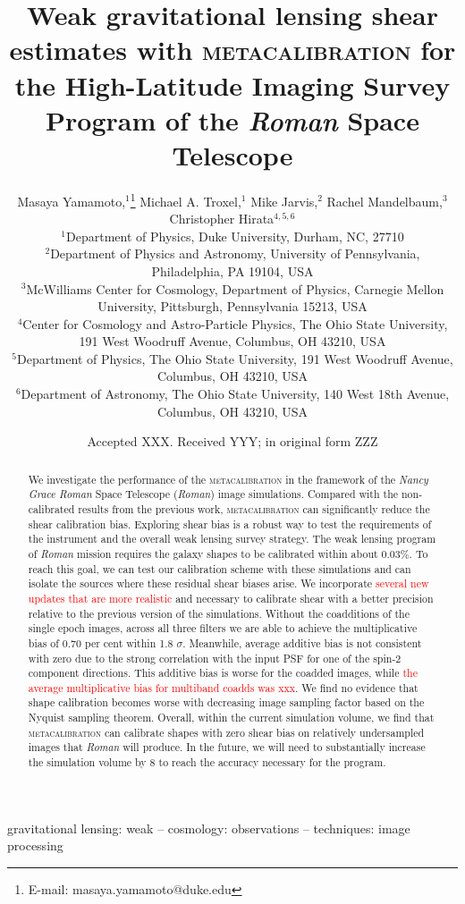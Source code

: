 \documentclass[fleqn,usenatbib]{mnras}
\title[Metacalibration with Roman High-Latitude Imaging Survey]{Weak gravitational lensing shear estimates with \textsc{metacalibration} for the High-Latitude Imaging Survey Program of the \emph{Roman} Space Telescope}
\author[M. Yamamoto et al.]{
Masaya Yamamoto,$^{1}$\thanks{E-mail: masaya.yamamoto@duke.edu}
Michael A. Troxel,$^{1}$
Mike Jarvis,$^{2}$
Rachel Mandelbaum,$^{3}$
Christopher Hirata$^{4,5,6}$
\\
$^{1}$Department of Physics, Duke University, Durham, NC, 27710\\
$^{2}$Department of Physics and Astronomy, University of Pennsylvania, Philadelphia, PA 19104, USA\\
$^{3}$McWilliams Center for Cosmology, Department of Physics, Carnegie Mellon University, Pittsburgh, Pennsylvania 15213, USA\\
$^{4}$Center for Cosmology and Astro-Particle Physics, The Ohio State University, 191 West Woodruff Avenue, Columbus, OH 43210, USA\\
$^{5}$Department of Physics, The Ohio State University, 191 West Woodruff Avenue, Columbus, OH 43210, USA\\
$^{6}$Department of Astronomy, The Ohio State University, 140 West 18th Avenue, Columbus, OH 43210, USA\\
}
\date{Accepted XXX. Received YYY; in original form ZZZ}
\begin{document}
\label{firstpage}
\pagerange{\pageref{firstpage}--\pageref{lastpage}}
\maketitle

\begin{abstract}
We investigate the performance of the \textsc{metacalibration} in the framework of the \emph{Nancy Grace Roman} Space Telescope (\emph{Roman}) image simulations. Compared with the non-calibrated results from the previous work, \textsc{metacalibration} can significantly reduce the shear calibration bias. Exploring shear bias is a robust way to test the requirements of the instrument and the overall weak lensing survey strategy. The weak lensing program of \emph{Roman} mission requires the galaxy shapes to be calibrated within about 0.03\%. To reach this goal, we can test our calibration scheme with these simulations and can isolate the sources where these residual shear biases arise. We incorporate \textcolor{red}{several new updates that are more realistic} and necessary to calibrate shear with a better precision relative to the previous version of the simulations. Without the coadditions of the single epoch images, across all three filters we are able to achieve the multiplicative bias of 0.70 per cent within 1.8 $\sigma$. Meanwhile, average additive bias is not consistent with zero due to the strong correlation with the input PSF for one of the spin-2 component directions. This additive bias is worse for the coadded images, while \textcolor{red}{the average multiplicative bias for multiband coadds was xxx}. We find no evidence that shape calibration becomes worse with decreasing image sampling factor based on the Nyquist sampling theorem. Overall, within the current simulation volume, we find that \textsc{metacalibration} can calibrate shapes with zero shear bias on relatively undersampled images that \emph{Roman} will produce. In the future, we will need to substantially increase the simulation volume by 8 to reach the accuracy necessary for the program. 
\end{abstract}

\begin{keywords}
gravitational lensing: weak -- cosmology: observations -- techniques: image processing
\end{keywords}

\end{document}
